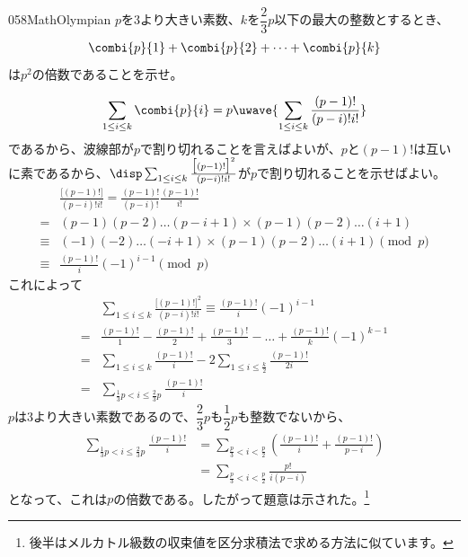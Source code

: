 \begin{prob}{058}{}{MathOlympian}
 $p$を3より大きい素数、$k$を$\dfrac{2}{3}p$以下の最大の整数とするとき、
 \begin{align*}
  \combi{p}{1}+\combi{p}{2}+\dots+\combi{p}{k}
 \end{align*}
 は$p^2$の倍数であることを示せ。
\end{prob}

\[ \sum_{1\le i\le k} \combi{p}{i}=p\uwave{\sum_{1\le i\le k}\frac{(p-1)!}{(p-i)! i!}} \]
であるから、波線部が$p$で割り切れることを言えばよいが、$p$と$(p-1)!$は互いに素であるから、$\disp \sum_{1\le i\le k}\frac{\bigl[(p-1)!\bigr]^2}{(p-i)! i!}$が$p$で割り切れることを示せばよい。
\begin{align*}
 &\frac{\bigl[(p-1)!\bigr]}{(p-i)! i!}=\frac{(p-1)!}{(p-i)!}\frac{(p-1)!}{i!} \\
 =& (p-1)(p-2)\dots(p-i+1)\times(p-1)(p-2)\dots(i+1) \\
 \equiv & (-1)(-2)\dots(-i+1)\times(p-1)(p-2)\dots(i+1) \pmod{p} \\
 \equiv & \frac{(p-1)!}{i}(-1)^{i-1} \pmod{p}
\end{align*}
これによって
\begin{align*}
 &\sum_{1\le i\le k} \frac{\bigl[(p-1)!\bigr]^2}{(p-i)! i!}\equiv \frac{(p-1)!}{i}(-1)^{i-1} \\
 =& \frac{(p-1)!}{1}-\frac{(p-1)!}{2}+\frac{(p-1)!}{3}-\dots+\frac{(p-1)!}{k}(-1)^{k-1} \\
 =& \sum_{1\le i\le k} \frac{(p-1)!}{i} - 2\sum_{1\le i\le \frac{k}{2}}\frac{(p-1)!}{2i} \\
 =& \sum_{\frac{1}{3}p< i\le \frac{2}{3}p} \frac{(p-1)!}{i}
\end{align*}
$p$は3より大きい素数であるので、$\dfrac{2}{3}p$も$\dfrac{1}{2}p$も整数でないから、
\begin{align*}
 \sum_{\frac{1}{3}p< i\le \frac{2}{3}p} \frac{(p-1)!}{i} &= \sum_{\frac{p}{3}<i<\frac{p}{2}}\left(\frac{(p-1)!}{i}+\frac{(p-1)!}{p-i}\right) \\
 &= \sum_{\frac{p}{3}<i<\frac{p}{2}} \frac{p!}{i(p-i)}
\end{align*}
となって、これは$p$の倍数である。したがって題意は示された。\footnote{後半はメルカトル級数の収束値を区分求積法で求める方法に似ています。}